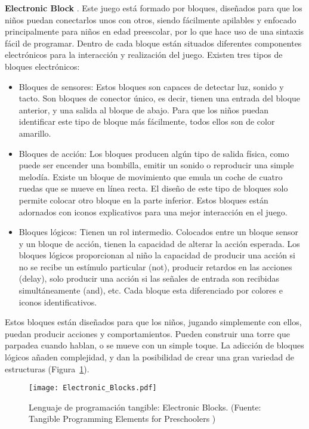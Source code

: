 \textbf{Electronic Block} \cite{Wyeth}. Este juego está formado por bloques, diseñados para que los niños puedan conectarlos unos con otros, siendo fácilmente apilables y enfocado principalmente para niños en edad preescolar, por lo que hace uso de una sintaxis fácil de programar. Dentro de cada bloque están situados diferentes componentes electrónicos para la interacción y realización del juego.
Existen tres tipos de bloques electrónicos:
\begin{itemize}
\item Bloques de sensores: Estos bloques son capaces de detectar luz, sonido y tacto. Son bloques de conector único, es decir, tienen una entrada del bloque anterior, y una salida al bloque de abajo. Para que los niños puedan identificar este tipo de bloque más fácilmente, todos ellos son de color amarillo.
\item Bloques de acción: Los bloques producen algún tipo de salida física, como puede ser encender una bombilla, emitir un sonido o reproducir una simple melodía. Existe un bloque de movimiento que emula un coche de cuatro ruedas que se mueve en línea recta.
El diseño de este tipo de bloques solo permite colocar otro bloque en la parte inferior. Estos bloques están adornados con iconos explicativos para una mejor interacción en el juego.
\item Bloques lógicos:  Tienen un rol intermedio. Colocados entre un bloque sensor y un bloque de acción, tienen la capacidad de alterar la acción esperada. Los bloques lógicos proporcionan al niño la capacidad de producir una acción si no se recibe un estímulo particular (not), producir retardos en las acciones (delay), solo producir una acción si las señales de entrada son recibidas simultáneamente (and), etc.
Cada bloque esta diferenciado por colores e iconos identificativos.
\end{itemize}

Estos bloques están diseñados para que los niños, jugando simplemente con ellos, puedan producir acciones y comportamientos. Pueden construir una torre que parpadea cuando hablan, o se mueve con un simple toque. La adicción de bloques lógicos añaden complejidad, y dan la posibilidad de crear una gran variedad de estructuras (Figura~\ref{fig:ElectronicBlocks}).

\begin{figure}[!h]
\begin{center}
\texttt{[image: Electronic\_Blocks.pdf]}
\caption{Lenguaje de programación tangible: Electronic Blocks. (Fuente: Tangible Programming Elements for Preschoolers \cite{Wyeth})}
\label{fig:ElectronicBlocks}
\end{center}
\end{figure}


